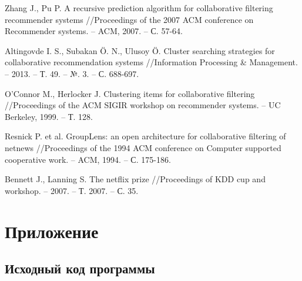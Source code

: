 \documentclass[a4paper, 12pt]{article} %
\begin{document}
\begin{thebibliography}{99}
 Zhang J., Pu P. A recursive prediction algorithm for collaborative filtering recommender systems //Proceedings of the 2007 ACM conference on Recommender systems. – ACM, 2007. – С. 57-64.

 Altingovde I. S., Subakan Ö. N., Ulusoy Ö. Cluster searching strategies for collaborative recommendation systems //Information Processing \& Management. – 2013. – Т. 49. – №. 3. – С. 688-697.

 O’Connor M., Herlocker J. Clustering items for collaborative filtering //Proceedings of the ACM SIGIR workshop on recommender systems. – UC Berkeley, 1999. – Т. 128.

 Resnick P. et al. GroupLens: an open architecture for collaborative filtering of netnews //Proceedings of the 1994 ACM conference on Computer supported cooperative work. – ACM, 1994. – С. 175-186.

 Bennett J., Lanning S. The netflix prize //Proceedings of KDD cup and workshop. – 2007. – Т. 2007. – С. 35.

\end{thebibliography}

\newpage
\section{Приложение}
\subsection{Исходный код программы}
\end{document}
